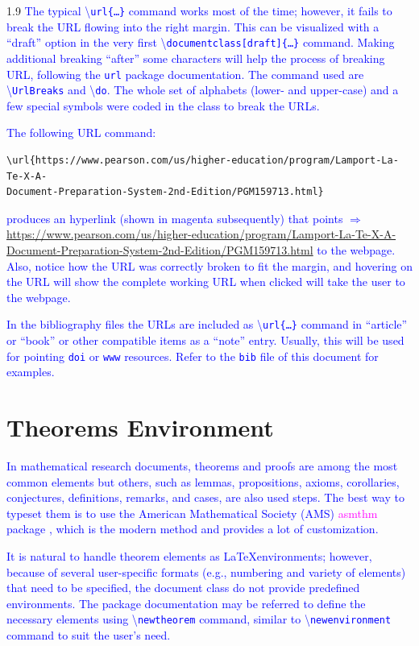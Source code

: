 \documentclass[phd]{ndsu-thesis-2022}
\newcommand\myspacing{1.9}      %
\newcommand\italk[1]{\textcolor{blue}{#1}}  %
\newcommand\cmd[1]{\textbackslash\texttt{#1}}  %
\begin{document}
\begin{spacing}{\myspacing}
\italk{The typical \cmd{url\{\ldots\}} command works most of the time; however, it fails to break the URL flowing into the right margin. This can be visualized with a ``draft'' option in the very first \cmd{documentclass[draft]\{\ldots\}} command. Making additional breaking ``after'' some characters will help the process of breaking URL, following the \texttt{url} package documentation. The command used are \cmd{UrlBreaks} and \cmd{do}. The whole set of alphabets (lower- and upper-case) and a few special symbols were coded in the class to break the URLs.}

\italk{The following URL command:} 
\vspace{-2ex}
\begin{verbatim}
\url{https://www.pearson.com/us/higher-education/program/Lamport-La-Te-X-A-
Document-Preparation-System-2nd-Edition/PGM159713.html}
\end{verbatim}

\noindent \italk{produces an hyperlink (shown in magenta subsequently) that points $\Rightarrow$ }\textcolor{magenta}{\url{https://www.pearson.com/us/higher-education/program/Lamport-La-Te-X-A-Document-Preparation-System-2nd-Edition/PGM159713.html}} \italk{to the webpage. Also, notice how the URL was correctly broken to fit the margin, and hovering on the URL will show the complete working URL when clicked will take the user to the webpage.}

\italk{In the bibliography files the URLs are included as \cmd{url\{\ldots\}} command in ``article'' or ``book'' or other compatible items as a ``note'' entry. Usually, this will be used for pointing \texttt{doi} or \texttt{www} resources. Refer to the \texttt{bib} file of this document for examples. } 

\section{Theorems Environment}

\italk{In mathematical research documents, theorems and proofs are among the most common elements but others, such as lemmas, propositions, axioms, corollaries, conjectures, definitions, remarks, and cases, are also used steps. The best way to typeset them is to use the American Mathematical Society (AMS) \textcolor{magenta}{asmthm} package \citep{amsthm2017}, which is the modern method and provides a lot of customization.} 

\italk{It is natural to handle theorem elements as \LaTeX environments; however, because of several user-specific formats (e.g., numbering and variety of elements) that need to be specified, the document class do not provide predefined environments. The package documentation may be referred to define the necessary elements using \cmd{newtheorem} command, similar to \cmd{newenvironment} command to suit the user's need.} 


\end{spacing}
\end{document}
